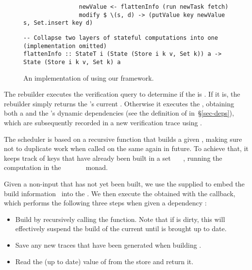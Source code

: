 \begin{figure}
\begin{verbatim}
                newValue <- flattenInfo (run newTask fetch)
                modify $ \(s, d) -> (putValue key newValue s, Set.insert key d)
\end{verbatim}
\vspace{0mm}
\begin{verbatim}
-- Collapse two layers of stateful computations into one (implementation omitted)
flattenInfo :: StateT i (State (Store i k v, Set k)) a -> State (Store i k v, Set k) a
\end{verbatim}
\vspace{-3mm}
\caption{An implementation of \Shake using our framework.}\label{fig-shake-implementation}
\vspace{-6mm}
\end{figure}

The rebuilder executes the verification query  to determine if the
 is . If it is, the rebuilder simply returns the 's
current . Otherwise it executes the , obtaining both a
 and the 's dynamic dependencies  (see the
definition of  in~\S\ref{sec-deps}), which are subsequently recorded
in a new verification trace using .

The  scheduler is based on a recursive function  that
builds a given , making sure not to duplicate work when called on the
same  again in future. To achieve that, it keeps track of keys that have
already been built in a set ~\hs{::}~~, running the
computation in the
~~~~~~ monad.

Given a non-input  that has not yet been built, we use the supplied
 to embed the build information~ into the .
We then execute the obtained  with the  callback, which
performs the following three steps when given a dependency :

\begin{itemize}
    \item Build  by recursively calling the  function. Note
          that if  is dirty, this will effectively suspend the build of
          the current  until  is brought up to date.
    \item Save any new traces that have been generated when building .
    \item Read the (up to date) value of  from the store and return it.
\end{itemize}

